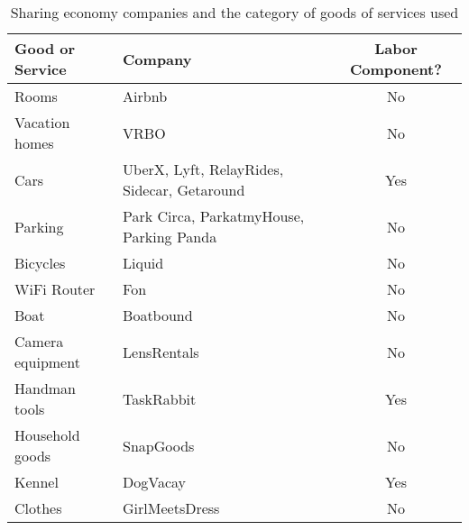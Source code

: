 \documentclass[11pt]{article}
\begin{document}
\begin{table}
\caption{Sharing economy companies and the category of goods of services used}
\centering
\begin{tabular}{llc} 
\toprule
Good or Service & Company & Labor Component? \\ 
\hline Rooms           & Airbnb & No \\ 
Vacation homes  & VRBO   & No \\ 
Cars            & UberX, Lyft, RelayRides, Sidecar, Getaround & Yes \\   
Parking         & Park Circa, ParkatmyHouse, Parking Panda & No \\
Bicycles        & Liquid & No \\   
WiFi Router     & Fon & No \\ 
Boat            & Boatbound & No \\
Camera equipment& LensRentals & No \\  
Handman tools   & TaskRabbit  & Yes \\
Household goods & SnapGoods   & No \\ 
Kennel          & DogVacay   & Yes \\ 
Clothes         & GirlMeetsDress & No \\
\bottomrule
\end{tabular}  
\end{table}
\end{document}
